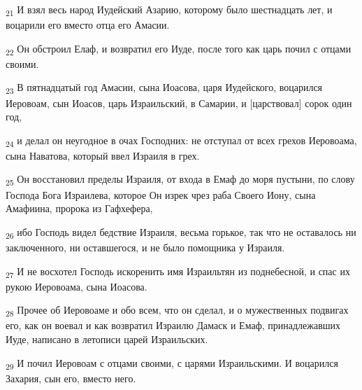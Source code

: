 \begin{tcolorbox}
\textsubscript{21} И взял весь народ Иудейский Азарию, которому было шестнадцать лет, и воцарили его вместо отца его Амасии.
\end{tcolorbox}
\begin{tcolorbox}
\textsubscript{22} Он обстроил Елаф, и возвратил его Иуде, после того как царь почил с отцами своими.
\end{tcolorbox}
\begin{tcolorbox}
\textsubscript{23} В пятнадцатый год Амасии, сына Иоасова, царя Иудейского, воцарился Иеровоам, сын Иоасов, царь Израильский, в Самарии, и [царствовал] сорок один год,
\end{tcolorbox}
\begin{tcolorbox}
\textsubscript{24} и делал он неугодное в очах Господних: не отступал от всех грехов Иеровоама, сына Наватова, который ввел Израиля в грех.
\end{tcolorbox}
\begin{tcolorbox}
\textsubscript{25} Он восстановил пределы Израиля, от входа в Емаф до моря пустыни, по слову Господа Бога Израилева, которое Он изрек чрез раба Своего Иону, сына Амафиина, пророка из Гафхефера,
\end{tcolorbox}
\begin{tcolorbox}
\textsubscript{26} ибо Господь видел бедствие Израиля, весьма горькое, так что не оставалось ни заключенного, ни оставшегося, и не было помощника у Израиля.
\end{tcolorbox}
\begin{tcolorbox}
\textsubscript{27} И не восхотел Господь искоренить имя Израильтян из поднебесной, и спас их рукою Иеровоама, сына Иоасова.
\end{tcolorbox}
\begin{tcolorbox}
\textsubscript{28} Прочее об Иеровоаме и обо всем, что он сделал, и о мужественных подвигах его, как он воевал и как возвратил Израилю Дамаск и Емаф, принадлежавших Иуде, написано в летописи царей Израильских.
\end{tcolorbox}
\begin{tcolorbox}
\textsubscript{29} И почил Иеровоам с отцами своими, с царями Израильскими. И воцарился Захария, сын его, вместо него.
\end{tcolorbox}
